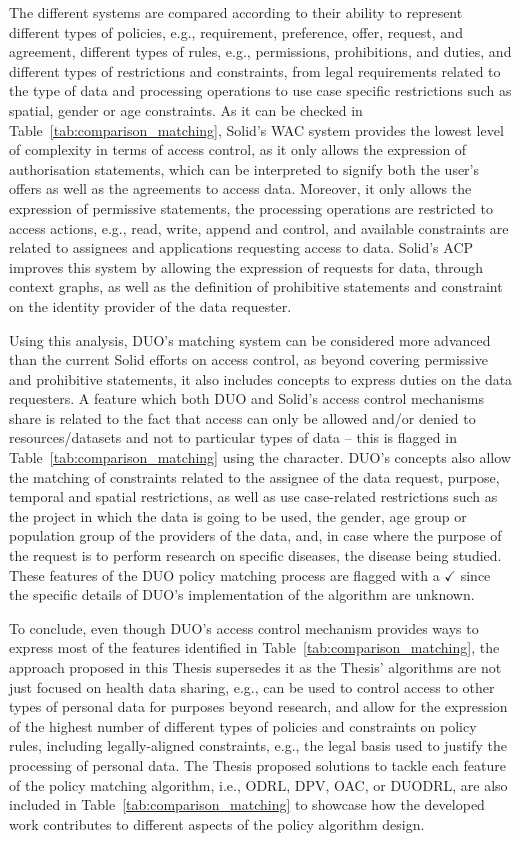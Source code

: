 The different systems are compared according to their ability to represent different types of policies, e.g., requirement, preference, offer, request, and agreement, different types of rules, e.g., permissions, prohibitions, and duties, and different types of restrictions and constraints, from legal requirements related to the type of data and processing operations to use case specific restrictions such as spatial, gender or age constraints.
As it can be checked in Table~\ref{tab:comparison_matching}, Solid's WAC system provides the lowest level of complexity in terms of access control, as it only allows the expression of authorisation statements, which can be interpreted to signify both the user's offers as well as the agreements to access data.
Moreover, it only allows the expression of permissive statements, the processing operations are restricted to access actions, e.g., read, write, append and control, and available constraints are related to assignees and applications requesting access to data.
Solid's ACP improves this system by allowing the expression of requests for data, through context graphs, as well as the definition of prohibitive statements and constraint on the identity provider of the data requester.

Using this analysis, DUO's matching system can be considered more advanced than the current Solid efforts on access control, as beyond covering permissive and prohibitive statements, it also includes concepts to express duties on the data requesters.
A feature which both DUO and Solid's access control mechanisms share is related to the fact that access can only be allowed and/or denied to resources/datasets and not to particular types of data -- this is flagged in Table~\ref{tab:comparison_matching} using the \textasteriskcentered{} character.
DUO's concepts also allow the matching of constraints related to the assignee of the data request, purpose, temporal and spatial restrictions, as well as use case-related restrictions such as the project in which the data is going to be used, the gender, age group or population group of the providers of the data, and, in case where the purpose of the request is to perform research on specific diseases, the disease being studied.
These features of the DUO policy matching process are flagged with a $\checkmark$ since the specific details of DUO's implementation of the algorithm are unknown.

To conclude, even though DUO's access control mechanism provides ways to express most of the features identified in Table~\ref{tab:comparison_matching}, the approach proposed in this Thesis supersedes it as the Thesis' algorithms are not just focused on health data sharing, e.g., can be used to control access to other types of personal data for purposes beyond research, and allow for the expression of the highest number of different types of policies and constraints on policy rules, including legally-aligned constraints, e.g., the legal basis used to justify the processing of personal data.
The Thesis proposed solutions to tackle each feature of the policy matching algorithm, i.e., ODRL, DPV, OAC, or DUODRL, are also included in Table~\ref{tab:comparison_matching} to showcase how the developed work contributes to different aspects of the policy algorithm design.

